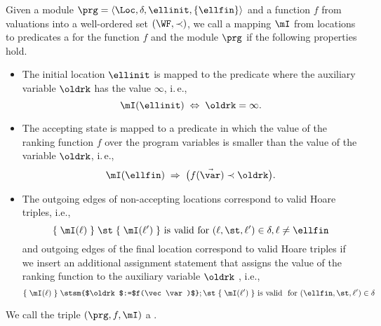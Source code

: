 \begin{definition} Given a module $\prg=\langle \Loc,\delta, \ellinit, \{\ellfin\} \rangle$
and a function $f$ from valuations into a well-ordered set $(\WF,\prec)$,
we call a mapping $\mI$ from locations to predicates
a  for the function $f$ and the module $\prg$ if the following properties hold.

\begin{itemize}
  \item The initial location $\ellinit$ is mapped to the predicate where the auxiliary variable $\oldrk$ has the value $\infty$, i.\,e.,
 $$ \mI(\ellinit) \;\Leftrightarrow\; \oldrk = \infty.$$

 \item The accepting state is mapped to a predicate in which the value of the ranking function $f$ over the program variables is smaller than the value of the variable $\oldrk$, i.\,e., 
 $$ \mI(\ellfin) \;\Rightarrow\;  \big(f(\vec\var)\prec\oldrk\big).$$


 \item The outgoing edges of non-accepting locations correspond to valid Hoare triples, i.e.,
   $$\{ \; \mI(\ell) \; \} \; \st \;  \{ \; \mI(\ell') \; \} \text { is valid } 
\mbox{for }(\ell,\st,\ell')\in\delta, \ell\neq\ellfin
$$
 and outgoing edges of the final location correspond to valid Hoare triples if we insert an additional assignment statement that assigns the value of the ranking function to the auxiliary variable $\oldrk$ , i.e.,
   $$\{ \; \mI(\ell) \; \} \; \stsm{$\oldrk$:=$f(\vec\var)$};\st \;  \{ \; \mI(\ell') \; \} \text { is valid } 
\mbox{ for }(\ellfin,\st,\ell')\in\delta
$$
\end{itemize}
\noindent
We call the triple $(\prg,f,\mI)$ a .
\end{definition}


